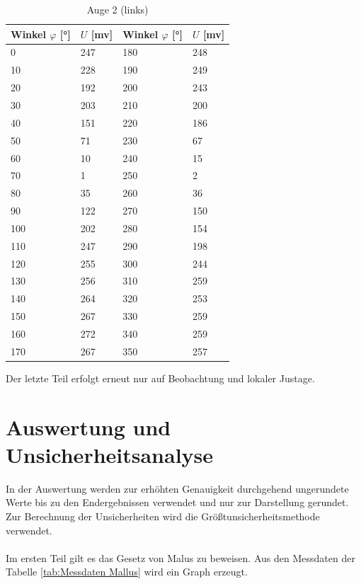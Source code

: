 \documentclass[12pt,a4paper,twoside]{article}
\begin{document}
\begin{table}[H]
    \centering
    \caption{Auge 2 (links)}
    \label{tab:Messdaten Auge links}
    \begin{tabular}{| l | l | l | l |}
        \hline
        Winkel $\varphi$ [°] & $U$ [mv] & Winkel $\varphi$ [°] & $U$ [mv] \\
        \hline
        0       & 247  & 180   & 248  \\
        10      & 228  & 190   & 249  \\
        20      & 192  & 200   & 243  \\
        30      & 203  & 210   & 200  \\
        40      & 151  & 220   & 186  \\
        50      & 71   & 230   & 67   \\
        60      & 10   & 240   & 15   \\
        70      & 1    & 250   & 2    \\
        80      & 35   & 260   & 36   \\
        90      & 122  & 270   & 150  \\
        100     & 202  & 280   & 154  \\
        110     & 247  & 290   & 198  \\
        120     & 255  & 300   & 244  \\
        130     & 256  & 310   & 259  \\
        140     & 264  & 320   & 253  \\
        150     & 267  & 330   & 259  \\
        160     & 272  & 340   & 259  \\
        170     & 267  & 350   & 257  \\
        \hline
    \end{tabular}
\end{table}

\noindent
Der letzte Teil erfolgt erneut nur auf Beobachtung und lokaler Justage. 

\section{Auswertung und Unsicherheitsanalyse} %
In der Auswertung werden zur erhöhten Genauigkeit durchgehend ungerundete Werte bis zu den Endergebnissen verwendet und nur zur Darstellung gerundet. \\
Zur Berechnung der Unsicherheiten wird die Größtunsicherheitsmethode verwendet.
\\
\\
Im ersten Teil gilt es das Gesetz von Malus zu beweisen. 
Aus den Messdaten der Tabelle \ref{tab:Messdaten Mallus} wird ein Graph erzeugt. 
\end{document}
